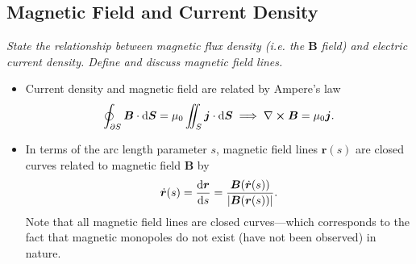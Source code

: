 \documentclass[11pt, a4paper]{article}
\newcommand{\diff}{\mathop{}\!\mathrm{d}} %
\renewcommand{\vec}[1]{\bm{#1}} %
\renewcommand{\r}{\vec{r}}
\newcommand{\B}{\vec{B}} %
\newcommand{\mm}{\mu_{0}}  %
\renewcommand{\j}{\vec{j}}  %
\renewcommand{\curl}{\nabla \cross}
\begin{document}
\subsection{Magnetic Field and Current Density}
\textit{State the relationship between magnetic flux density (i.e. the $ \B $ field) and electric current density. Define and discuss magnetic field lines.}

\begin{itemize}
    \item Current density and magnetic field are related by Ampere's law
    \begin{equation*}
        \oint_{\partial S} \B \cdot \diff \vec{S} = \mm \iint_{S} \j \cdot \diff \vec{S} \implies \curl \B = \mm \j.
    \end{equation*}
    
    \item In terms of the arc length parameter $ s $, magnetic field lines $ \r(s) $ are closed curves related to magnetic field $ \B $ by
	\begin{equation*}
		\dot{\r}(s) = \dv{\r}{s} = \frac{\B(\dot{\r}(s))}{\abs{\B(\r(s))}}.
	\end{equation*}
    Note that all magnetic field lines are closed curves---which corresponds to the fact that magnetic monopoles do not exist (have not been observed) in nature.
    
\end{itemize}
\end{document}
